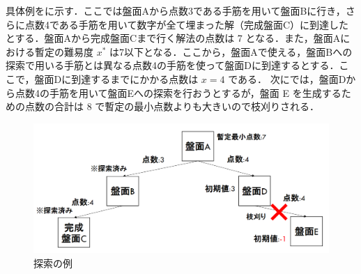 \documentclass[submit,techrep,noauthor]{ipsj}
\begin{document}
具体例をに示す．ここでは盤面Aから点数3である手筋を用いて盤面Bに行き，さらに点数4である手筋を用いて数字が全て埋まった解（完成盤面C）に到達したとする．盤面Aから完成盤面Cまで行く解法の点数は 7 となる．また，盤面Aにおける暫定の難易度 $x^*$ は7以下となる．ここから，盤面Aで使える，盤面Bへの探索で用いる手筋とは異なる点数4の手筋を使って盤面Dに到達するとする．ここで，盤面Dに到達するまでにかかる点数は $x = 4$ である．%
次にでは，盤面Dから点数4の手筋を用いて盤面Eへの探索を行おうとするが，盤面 E を生成するための点数の合計は 8 で暫定の最小点数よりも大きいので枝刈りされる．

	\begin{figure}[tb]
 	\includegraphics[keepaspectratio, scale=0.32]
      		{sudoku_search.png}
 	\caption{探索の例}
 	\label{sudoku_search}
	\end{figure}

\end{document}

